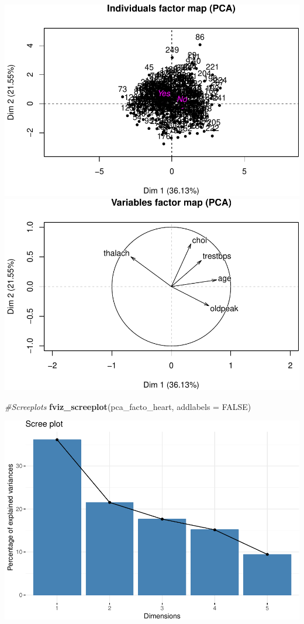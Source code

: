 \documentclass[]{article}
\newenvironment{Shaded}{\begin{snugshade}}{\end{snugshade}}
\newcommand{\KeywordTok}[1]{\textcolor[rgb]{0.13,0.29,0.53}{\textbf{#1}}}
\newcommand{\DataTypeTok}[1]{\textcolor[rgb]{0.13,0.29,0.53}{#1}}
\newcommand{\CommentTok}[1]{\textcolor[rgb]{0.56,0.35,0.01}{\textit{#1}}}
\newcommand{\OtherTok}[1]{\textcolor[rgb]{0.56,0.35,0.01}{#1}}
\newcommand{\NormalTok}[1]{#1}
\begin{document}
\includegraphics{project_report_files/figure-latex/unnamed-chunk-9-1.pdf}
\includegraphics{project_report_files/figure-latex/unnamed-chunk-9-2.pdf}

\begin{Shaded}
\begin{Highlighting}[]
\CommentTok{#Screeplots}
\KeywordTok{fviz_screeplot}\NormalTok{(pca_facto_heart, }\DataTypeTok{addlabels =} \OtherTok{FALSE}\NormalTok{)}
\end{Highlighting}
\end{Shaded}

\includegraphics{project_report_files/figure-latex/unnamed-chunk-10-1.pdf}
\end{document}
